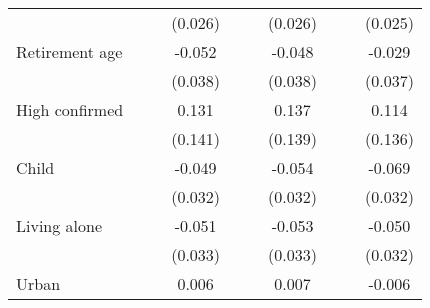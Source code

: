 {\begin{tabular}{l*{9}{c}}
                    &                     &                     &     (0.026)         &                     &                     &     (0.026)         &                     &                     &     (0.025)         \\
\addlinespace
Retirement age      &                     &                     &      -0.052         &                     &                     &      -0.048         &                     &                     &      -0.029         \\
                    &                     &                     &     (0.038)         &                     &                     &     (0.038)         &                     &                     &     (0.037)         \\
\addlinespace
High confirmed      &                     &                     &       0.131         &                     &                     &       0.137         &                     &                     &       0.114         \\
                    &                     &                     &     (0.141)         &                     &                     &     (0.139)         &                     &                     &     (0.136)         \\
\addlinespace
Child               &                     &                     &      -0.049         &                     &                     &      -0.054\sym{*}  &                     &                     &      -0.069\sym{**} \\
                    &                     &                     &     (0.032)         &                     &                     &     (0.032)         &                     &                     &     (0.032)         \\
\addlinespace
Living alone        &                     &                     &      -0.051         &                     &                     &      -0.053         &                     &                     &      -0.050         \\
                    &                     &                     &     (0.033)         &                     &                     &     (0.033)         &                     &                     &     (0.032)         \\
\addlinespace
Urban               &                     &                     &       0.006         &                     &                     &       0.007         &                     &                     &      -0.006         \\

\end{tabular}}
